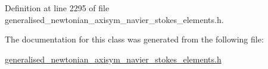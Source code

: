 Definition at line 2295 of file generalised\+\_\+newtonian\+\_\+axisym\+\_\+navier\+\_\+stokes\+\_\+elements.\+h.



The documentation for this class was generated from the following file\+:\begin{DoxyCompactItemize}
\item 
\hyperlink{generalised__newtonian__axisym__navier__stokes__elements_8h}{generalised\+\_\+newtonian\+\_\+axisym\+\_\+navier\+\_\+stokes\+\_\+elements.\+h}\end{DoxyCompactItemize}
